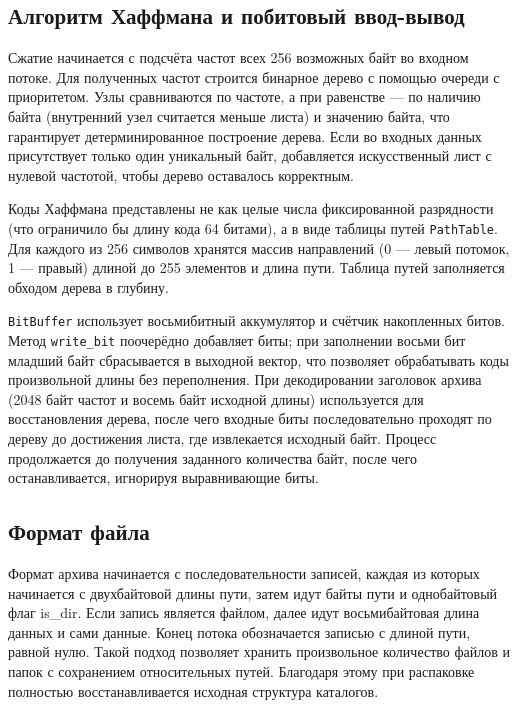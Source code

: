 \documentclass[a4paper]{article}
\begin{document}
\subsection{Алгоритм Хаффмана и побитовый ввод-вывод}

Сжатие начинается с подсчёта частот всех 256 возможных байт во входном потоке. Для полученных частот строится бинарное дерево с помощью очереди с приоритетом. Узлы сравниваются по частоте, а при равенстве --- по наличию байта (внутренний узел считается меньше листа) и значению байта, что гарантирует детерминированное построение дерева. Если во входных данных присутствует только один уникальный байт, добавляется искусственный лист с нулевой частотой, чтобы дерево оставалось корректным.

Коды Хаффмана представлены не как целые числа фиксированной разрядности (что ограничило бы длину кода 64 битами), а в виде таблицы путей \texttt{PathTable}. Для каждого из 256 символов хранятся массив направлений (0 — левый потомок, 1 — правый) длиной до 255 элементов и длина пути. Таблица путей заполняется обходом дерева в глубину.

\texttt{BitBuffer} использует восьмибитный аккумулятор и счётчик накопленных битов. Метод \texttt{write\_bit} поочерёдно добавляет биты; при заполнении восьми бит младший байт сбрасывается в выходной вектор, что позволяет обрабатывать коды произвольной длины без переполнения. При декодировании заголовок архива (2048 байт частот и восемь байт исходной длины) используется для восстановления дерева, после чего входные биты последовательно проходят по дереву до достижения листа, где извлекается исходный байт. Процесс продолжается до получения заданного количества байт, после чего останавливается, игнорируя выравнивающие биты.

\subsection{Формат файла}

Формат архива начинается с последовательности записей, каждая из которых начинается с двухбайтовой длины пути, затем идут байты пути и однобайтовый флаг is\_dir. Если запись является файлом, далее идут восьмибайтовая длина данных и сами данные. Конец потока обозначается записью с длиной пути, равной нулю. Такой подход позволяет хранить произвольное количество файлов и папок с сохранением относительных путей. Благодаря этому при распаковке полностью восстанавливается исходная структура каталогов.
\end{document}
